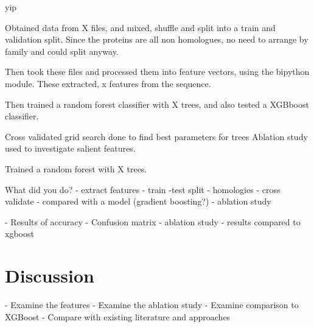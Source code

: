 \documentclass{bioinfo}
\begin{document}




  







\newpage
yip
\newpage

Obtained data from X files, and mixed, shuffle and split into a train and validation split. Since the proteins are all non homologues, no need to arrange by family and could split anyway. 

Then took these files and processed them into feature vectors, using the bipython module. These extracted, x features from the sequence. 

Then trained a random forest classifier with X trees, and also tested a XGBboost classifier.

Cross validated grid search done to find best parameters for trees
Ablation study used to investigate salient features.

Trained a random forest with X trees. 

What did you do?
    - extract features
    - train -test split - homologies
    - cross validate
    - compared with a model (gradient boosting?)
    - ablation study



    - Results of accuracy
    - Confusion matrix
    - ablation study
    - results compared to xgboost
\section{Discussion}
   - Examine the features
   - Examine the ablation study
   - Examine comparison to XGBoost
   - Compare with existing literature and approaches
\end{document}
